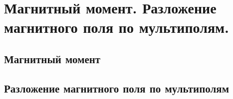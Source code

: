 \chapter{Магнитный момент. Разложение магнитного поля по мультиполям.}

\section{Магнитный момент}
\section{Разложение магнитного поля по мультиполям}
